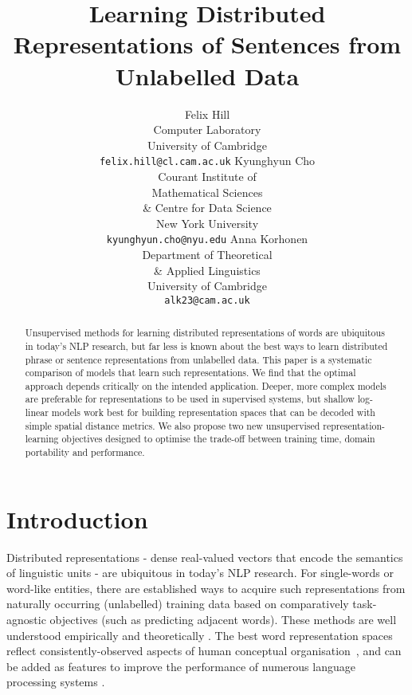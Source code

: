 \documentclass[11pt,letterpaper]{article}
\title{Learning Distributed Representations of Sentences from Unlabelled Data}
\author{Felix Hill\\
	    Computer Laboratory\\
	    University of Cambridge\\
	    {\tt \small felix.hill@cl.cam.ac.uk}
	  \And
	Kyunghyun Cho\\
  	Courant Institute of \\ 
        Mathematical Sciences\\
  	\& Centre for Data Science\\
  	New York University\\
  {\tt \small kyunghyun.cho@nyu.edu}
	  \And
	Anna Korhonen\\
	    Department of Theoretical \\ 
             \& Applied Linguistics \\
	    University of Cambridge\\
	    {\tt \small alk23@cam.ac.uk}}
\date{}
\begin{document}
\maketitle

\begin{abstract}
Unsupervised methods for learning distributed representations of words are ubiquitous in today's NLP research, but far less is known about the best ways to learn distributed phrase or sentence representations from unlabelled data. This paper is a systematic comparison of models that learn such representations. We find that the optimal approach depends critically on the intended application. Deeper, more complex models are preferable for representations to be used in supervised systems, but shallow log-linear models work best for building representation spaces that can be decoded with simple spatial distance metrics. We also propose two new unsupervised representation-learning objectives designed to optimise the trade-off between training time, domain portability and performance. 
  
\end{abstract}

\section{Introduction}

Distributed representations - dense real-valued vectors that encode the semantics of linguistic units - are ubiquitous in today's NLP research. For single-words or word-like entities, there are established ways to acquire such representations from naturally occurring (unlabelled) training data based on comparatively task-agnostic objectives (such as predicting adjacent words). These methods are well understood empirically \cite{baroni2014don} and theoretically \cite{levy2014neural}. The best word representation spaces reflect consistently-observed aspects of human conceptual organisation~\cite{hill2014simlex}, and can be added as features to improve the performance of numerous language processing systems \cite{collobert2011natural}. 
\end{document}

